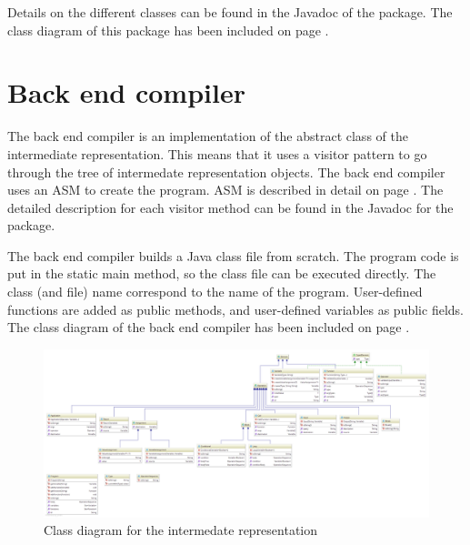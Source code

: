 Details on the different classes can be found in the Javadoc of the  package. The class diagram of this package has been included on page \pageref{fig:class_diagram__intermediate}.

\section{Back end compiler}

The back end compiler is an implementation of the  abstract class of the intermediate representation.
This means that it uses a visitor pattern to go through the tree of intermedate representation objects.
The back end compiler uses an ASM  to create the program.
ASM is described in detail on page \pageref{subj:asm}.
The detailed description for each visitor method can be found in the Javadoc for the  package.

The back end compiler builds a Java class file from scratch.
The program code is put in the static main method, so the class file can be executed directly.
The class (and file) name correspond to the name of the program.
User-defined functions are added as public methods, and user-defined variables as public fields.
The class diagram of the back end compiler has been included on page \pageref{fig:class_diagram__jvm}.

\begin{landscape}
\begin{figure}[p]
\centering
\includegraphics[scale=0.25]{Images/class_diagram__intermediate}
\caption{Class diagram for the intermedate representation}
\label{fig:class_diagram__intermediate}
\end{figure}
\end{landscape}

